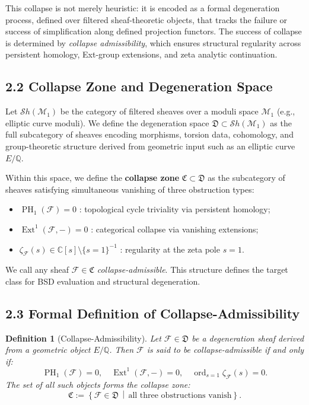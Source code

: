 \documentclass[11pt]{article}
\newtheorem{definition}[theorem]{Definition}
\DeclareMathOperator{\Ext}{Ext}
\DeclareMathOperator{\PH}{PH}
\newcommand{\ord}{\operatorname{ord}}
\begin{document}
This collapse is not merely heuristic: it is encoded as a formal degeneration process, defined over filtered sheaf-theoretic objects, that tracks the failure or success of simplification along defined projection functors. The success of collapse is determined by \emph{collapse admissibility}, which ensures structural regularity across persistent homology, Ext-group extensions, and zeta analytic continuation.

\subsection*{2.2 Collapse Zone and Degeneration Space}

Let \( \mathcal{S}h(\mathcal{M}_1) \) be the category of filtered sheaves over a moduli space \( \mathcal{M}_1 \) (e.g., elliptic curve moduli). We define the degeneration space \( \mathfrak{D} \subset \mathcal{S}h(\mathcal{M}_1) \) as the full subcategory of sheaves encoding morphisms, torsion data, cohomology, and group-theoretic structure derived from geometric input such as an elliptic curve \( E/\mathbb{Q} \).

Within this space, we define the \textbf{collapse zone} \( \mathfrak{C} \subset \mathfrak{D} \) as the subcategory of sheaves satisfying simultaneous vanishing of three obstruction types:

\begin{itemize}
  \item \( \PH_1(\mathcal{F}) = 0 \) : topological cycle triviality via persistent homology;
  \item \( \Ext^1(\mathcal{F}, -) = 0 \) : categorical collapse via vanishing extensions;
  \item \( \zeta_{\mathcal{F}}(s) \in \mathbb{C}[s] \setminus \{s=1\}^{-1} \) : regularity at the zeta pole \( s = 1 \).
\end{itemize}

We call any sheaf \( \mathcal{F} \in \mathfrak{C} \) \emph{collapse-admissible}. This structure defines the target class for BSD evaluation and structural degeneration.

\subsection*{2.3 Formal Definition of Collapse-Admissibility}

\begin{definition}[Collapse-Admissibility]
\label{def:collapse-admissibility}
Let \( \mathcal{F} \in \mathfrak{D} \) be a degeneration sheaf derived from a geometric object \( E/\mathbb{Q} \). Then \( \mathcal{F} \) is said to be \emph{collapse-admissible} if and only if:
\[
\PH_1(\mathcal{F}) = 0, \quad \Ext^1(\mathcal{F}, -) = 0, \quad \ord_{s=1} \zeta_{\mathcal{F}}(s) = 0.
\]
The set of all such objects forms the collapse zone:
\[
\mathfrak{C} := \left\{ \mathcal{F} \in \mathfrak{D} \,\middle|\, \text{all three obstructions vanish} \right\}.
\]
\end{definition}
\end{document}
